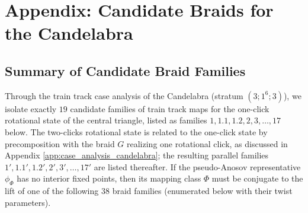 \chapter[Appendix: Candidate Braids for the Candelabra]{Appendix: Candidate Braids for the Candelabra}
\label{app:candidate_braids_candelabra}

\section{Summary of Candidate Braid Families}
\label{sec:summary_candelabra_braids}

Through the train track case analysis of the Candelabra (stratum $(3;1^6;3)$), we isolate exactly $19$ candidate families of train track maps for the one-click rotational state of the central triangle, listed as families $1, 1.1, 1.2, 2, 3, \ldots, 17$ below. The two-clicks rotational state is related to the one-click state by precomposition with the braid $G$ realizing one rotational click, as discussed in Appendix \ref{app:case_analysis_candelabra}; the resulting parallel families $1', 1.1', 1.2', 2', 3', \ldots, 17'$ are listed thereafter. If the pseudo-Anosov representative $\phi_\Phi$ has no interior fixed points, then its mapping class $\Phi$ must be conjugate to the lift of one of the following $38$ braid families (enumerated below with their twist parameters). 

